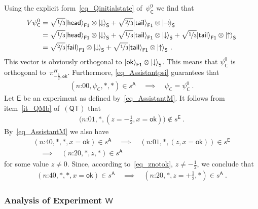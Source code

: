 \documentclass{article}
\theoremstyle{plain}
\theoremstyle{definition}
\newcommand*{\ket}[1]{{| #1 \rangle}}
\newcommand*{\Exp}{\mathsf{E}}
\newcommand*{\Friendone}{\mathsf{F1}}
\newcommand*{\Assistant}{\mathsf{A}}
\newcommand*{\Wigner}{\mathsf{W}}
\newcommand*{\Spin}{\mathsf{S}}
\newcommand*{\Coin}{\mathsf{C}}
\newcommand*{\spinup}{\ket{{\hspace{-0.1ex}\uparrow\hspace{-0.1ex}}}}
\newcommand*{\spindown}{\ket{{\hspace{-0.1ex}\downarrow\hspace{-0.1ex}}}}
\newcommand*{\spinright}{\ket{{\hspace{-0.2ex}\rightarrow\hspace{-0.4ex}}}}
\newcommand*{\sminus}{{\textstyle - \frac{1}{2}}}
\newcommand*{\splus}{{\textstyle + \frac{1}{2}}}
\newcommand*{\QT}{\mathsf{(QT)}}
\newcommand*{\ok}{\mathsf{ok}}
\newcommand*{\fail}{\mathsf{fail}}
\newcommand*{\head}{\mathsf{head}}
\newcommand*{\tail}{\mathsf{tail}}
\begin{document}
Using the explicit form~\eqref{eq_Qinitialstate} of~$\psi^0_{\Coin}$ we find that 
\begin{align}
  V \psi^0_\Coin 
  & = \sqrt{\nicefrac{1}{3}}\ket{\head}_{\Friendone}  \otimes  \spindown_\Spin + \sqrt{\nicefrac{2}{3}} \ket{\tail}_{\Friendone}  \otimes \spinright_\Spin\nonumber \\
    & = \sqrt{\nicefrac{1}{3}}  \ket{\head}_{\Friendone} \otimes  \spindown_\Spin  + \sqrt{\nicefrac{1}{3}}   \ket{\tail}_{\Friendone}  \otimes \spindown_\Spin  + \sqrt{\nicefrac{1}{3}} \ket{\tail}_{\Friendone} \otimes  \spinup_\Spin  \nonumber \\
  & = \sqrt{\nicefrac{2}{3}}  \ket{\fail}_{\Friendone} \otimes \spindown_\Spin + \sqrt{\nicefrac{1}{3}}  \ket{\tail}_{\Friendone}  \otimes \spinup_\Spin \ . \label{eq_jointstatetwo}
\end{align}
This vector is obviously orthogonal to $\ket{\ok}_{\Friendone} \otimes \spindown_{\Spin} $.  This means that $\psi^0_{\Coin}$ is orthogonal  to~$\pi^H_{-\frac{1}{2}, \ok}$.  Furthermore, \eqref{eq_Assistantpsi} guarantees that
\begin{align*}
  (\text{$n$:00}, \psi_{\Coin}, * , *) \in s^{\Assistant} \quad \implies \quad \psi_{\Coin} = \psi^0_{\Coin} \ .
\end{align*}
Let $\Exp$ be an experiment as defined by~\eqref{eq_AssistantM}.  It follows from item~\ref{it_QMb} of~$\QT$ that
\begin{align} \label{eq_znotok}
  \bigl(\text{$n$:01}, *, (z = \sminus, x = \ok) \bigr) \notin s^{\Exp} \ .
\end{align}
By~\eqref{eq_AssistantM} we also have
\begin{multline*}
  (\text{$n$:40}, * , *, x=\ok) \in s^{\Assistant}  \quad \implies \quad 
    (\text{$n$:01}, *, (z, x = \ok)) \in s^{\Exp}  \\ \quad \implies \quad 
  (\text{$n$:20}, * , z, *) \in s^{\Assistant} 
\end{multline*}
for some value $z \neq 0$.  Since, according to~\eqref{eq_znotok}, $z \neq \sminus$, we conclude that
\begin{align} \label{eq_QTAssistant}
  (\text{$n$:40}, * , *, x=\ok) \in s^{\Assistant}  
  \quad \implies \quad
 (\text{$n$:20}, * , z=\splus, *) \in s^{\Assistant} \ .
 \end{align}

\subsubsection*{Analysis of Experiment $\Wigner$} 
\end{document}
